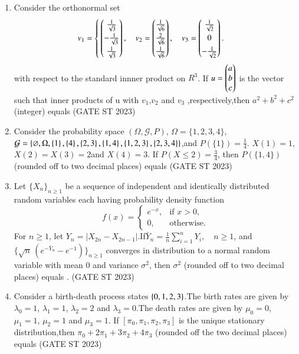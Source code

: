 \documentclass[journal]{IEEEtran}
\begin{document}
\begin{enumerate}[label=\textbf{Q.\arabic*.}, start=11, align=left, itemsep=2em]
\item Consider the orthonormal set 
\[
v_1 = \begin{cases}
\begin{pmatrix} \frac1{\sqrt3}\\[2pt] -\frac1{\sqrt3}\\[2pt] \frac1{\sqrt3} \end{pmatrix},
\quad
v_2 = \begin{pmatrix} \frac1{\sqrt6}\\[2pt] \frac2{\sqrt6}\\[2pt] \frac1{\sqrt6} \end{pmatrix},
\quad
v_3 = \begin{pmatrix} \frac1{\sqrt2}\\[2pt] 0\\[2pt] -\frac1{\sqrt2} \end{pmatrix}.
\end{cases}
\]
with respect to the standard innner product on $R^3$.
If $u = \begin{pmatrix}a\\b\\c \\\end{pmatrix}$ is the vector such that inner products of u with $v_1$,$v_2$ and $v_3$ ,respectively,then $a^2 + b^2 + c^2$ (integer) equals \underline{\hspace{3cm}}\hfill(GATE ST 2023)

\item Consider the probability space $(\Omega,\mathcal{G},P)$, $\Omega = \{1,2,3,4\}$, $\mathcal{G} = \left\{\varnothing, \Omega, \left\{1\right\}, \left\{4\right\}, \left\{2,3\right\}, \left\{1,4\right\}, \left\{1,2,3\right\}, \left\{2,3,4\right\}\right\}$,and $P(\{1\}) = \frac14$.  
$X(1)=1$, $X(2)=X(3)=2$and $X(4)=3$. If $P(X \le 2) = \frac34$, then $P(\{1,4\})$ (rounded off to two decimal places) equals \underline{\hspace{3cm}}\hfill(GATE ST 2023)

\item Let $\{X_n\}_{n \ge 1}$ be a sequence of independent and identically distributed random 
variables each having probability density function  
\[
f(x) = 
\begin{cases}
e^{-x}, & \text{if } x > 0, \\
0, & \text{otherwise}.
\end{cases}
\]
For $n \ge 1$, let  
$Y_n = \left| X_{2n} - X_{2n-1} \right|$.If$\bar{Y}_n = \frac{1}{n} \sum_{i=1}^n Y_i, \quad n \ge 1$,
and $\{\sqrt{n} \, ( e^{-\bar{Y}_n} - e^{-1} )\}_{n \ge 1}$ converges in distribution to a normal random variable with mean $0$ and variance $\sigma^2$, then $\sigma^2$ (rounded off to two decimal places) equals \underline{\hspace{2cm}}.
\hfill(GATE ST 2023)


\item Consider a birth-death process states $\left\{0,1,2,3\right\}$.The birth rates are given by $\lambda_0 = 1$, $\lambda_1 = 1$, $\lambda_2 = 2$ and $\lambda_3=0$.The death rates are given by $\mu_0=0$, $\mu_1=1$, $\mu_2=1$ and $\mu_3=1$. If  $[\pi_0,\pi_1,\pi_2,\pi_3]$ is the unique stationary distribution,then $\pi_0 + 2\pi_1 + 3\pi_2 + 4\pi_3$ (rounded off the two decimal places) equals \underline{\hspace{3cm}}\hfill{(GATE ST 2023)}



\end{enumerate}
\end{document}

